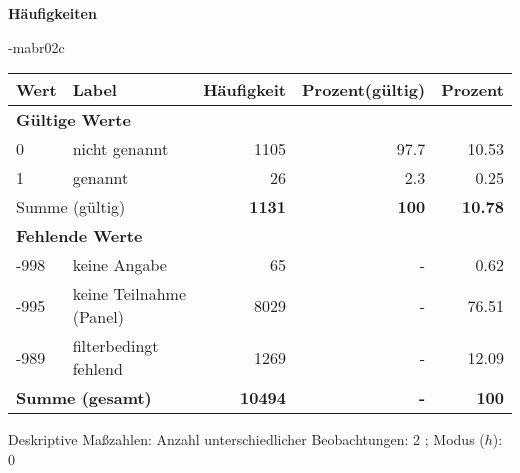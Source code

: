         		\vspace*{0.5cm}
                \noindent\textbf{Häufigkeiten}

                \vspace*{-\baselineskip}
					\begin{filecontents}{\jobname-mabr02c}
					\begin{longtable}{lXrrr}
					\toprule
					\textbf{Wert} & \textbf{Label} & \textbf{Häufigkeit} & \textbf{Prozent(gültig)} & \textbf{Prozent} \\
					\endhead
					\midrule
					\multicolumn{5}{l}{\textbf{Gültige Werte}}\\

					0 &
					\multicolumn{1}{X}{ nicht genannt   } &


					  \num{1105} &
					  \num[round-mode=places,round-precision=2]{97.7} &
					    \num[round-mode=places,round-precision=2]{10.53} \\

					1 &
					\multicolumn{1}{X}{ genannt   } &


					  \num{26} &
					  \num[round-mode=places,round-precision=2]{2.3} &
					    \num[round-mode=places,round-precision=2]{0.25} \\
					\midrule
					\multicolumn{2}{l}{Summe (gültig)} &
					  \textbf{\num{1131}} &
					\textbf{\num{100}} &
					  \textbf{\num[round-mode=places,round-precision=2]{10.78}} \\
					\multicolumn{5}{l}{\textbf{Fehlende Werte}}\\
							-998 &
							keine Angabe &
							  \num{65} &
							 - &
							  \num[round-mode=places,round-precision=2]{0.62} \\
							-995 &
							keine Teilnahme (Panel) &
							  \num{8029} &
							 - &
							  \num[round-mode=places,round-precision=2]{76.51} \\
							-989 &
							filterbedingt fehlend &
							  \num{1269} &
							 - &
							  \num[round-mode=places,round-precision=2]{12.09} \\
					\midrule
					\multicolumn{2}{l}{\textbf{Summe (gesamt)}} &
				      \textbf{\num{10494}} &
				    \textbf{-} &
				    \textbf{\num{100}} \\
					\bottomrule
					\end{longtable}
					\end{filecontents}
				\label{tableValues:mabr02c}
				\vspace*{-\baselineskip}
                    \begin{noten}
                	    \note{} Deskriptive Maßzahlen:
                	    Anzahl unterschiedlicher Beobachtungen: 2%
                	    ; 
                	      Modus ($h$): 0
                     \end{noten}

